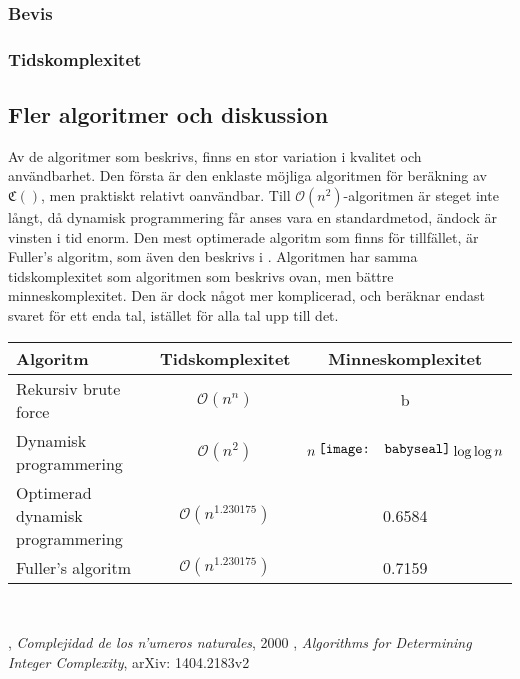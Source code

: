 \documentclass[a4paper,titlepage]{article}
\newcommand{\C}[1]{\mathfrak C \left( #1 \right)}
\renewcommand{\O}{\mathcal {O}}
\theoremstyle{definition}
\newcommand*\foobar{\texttt{[image: babyseal]}}
\renewcommand\cdot{\mathbin{\raisebox{2pt}{\foobar}}}
\begin{document}
\subsubsection{Bevis}

\subsubsection{Tidskomplexitet}

\subsection{Fler algoritmer och diskussion}
 
Av de algoritmer som beskrivs, finns en stor variation i kvalitet och användbarhet. Den första är den enklaste möjliga algoritmen för
beräkning av $\C{}$, men praktiskt relativt oanvändbar. Till $\O(n^2)$-algoritmen är steget inte långt, då dynamisk programmering får
anses vara en standardmetod, ändock är vinsten i tid enorm.
Den mest optimerade algoritm som finns för tillfället, är Fuller's algoritm, som även den beskrivs i \cite{algorithm_lune}.
Algoritmen har samma tidskomplexitet som algoritmen som beskrivs ovan, men bättre minneskomplexitet. Den är dock något mer komplicerad,
och beräknar endast svaret för ett enda tal, istället för alla tal upp till det. 
 \begin{tabular}[pos]{|l | c | c |}
 \hline
  \textbf{Algoritm} & \textbf{Tidskomplexitet} &  \textbf{Minneskomplexitet}\\ \hline
Rekursiv brute force & $\O(n^n)$ & b\\ \hline
Dynamisk programmering & $\O(n^2)$ & $n \cdot \log \log n$\\ \hline
Optimerad dynamisk programmering & $\O(n^{1.230175})$ & 0.6584 \\ \hline
Fuller's algoritm & $\O(n^{1.230175})$ & 0.7159\\ \hline

\end{tabular} \\

\newpage
\begin{thebibliography}{9}

        , \emph{Complejidad de los n'umeros naturales}, 2000
     	, \emph{Algorithms for Determining Integer Complexity}, arXiv: 1404.2183v2

\end{thebibliography}
%
\end{document}
